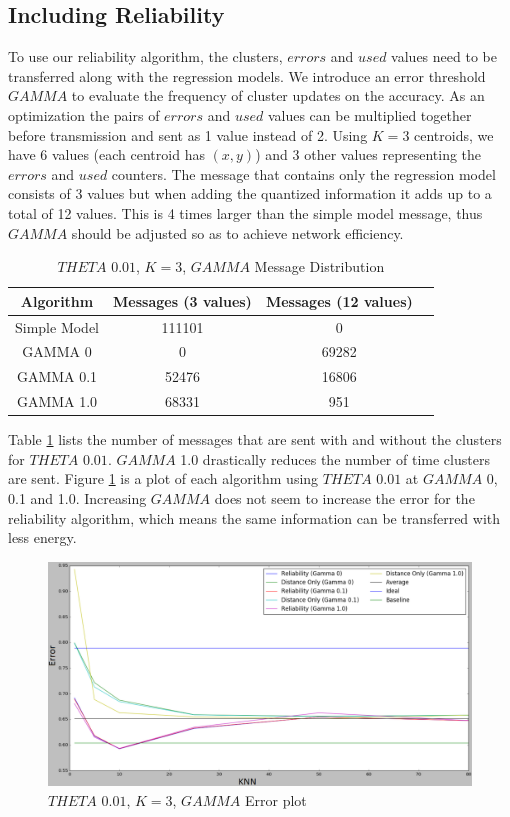 \documentclass{mproj}
\begin{document}
\subsection{Including Reliability}
To use our reliability algorithm, the clusters, $errors$ and $used$ values need to be transferred along with the regression models. We introduce an error threshold $GAMMA$ to evaluate the frequency of cluster updates on the accuracy. As an optimization the pairs of $errors$ and $used$ values can be multiplied together before transmission and sent as 1 value instead of 2. Using $K=3$ centroids, we have 6 values (each centroid has $(x,y)$) and 3 other values representing the $errors$ and $used$ counters. The message that contains only the regression model consists of 3 values but when adding the quantized information it adds up to a total of 12 values. This is 4 times larger than the simple model message, thus $GAMMA$ should be adjusted so as to achieve network efficiency.

\begin{table}[!ht]
 \centering
 \begin{tabular}{|| c | c | c | c ||}
 \hline
 Algorithm & Messages (3 values) & Messages (12 values)\\
 \hline\hline
 Simple Model & 111101 & 0 \\ 
 \hline
 GAMMA 0 & 0 & 69282 \\
 \hline
 GAMMA 0.1 & 52476 & 16806 \\
 \hline
 GAMMA 1.0 & 68331 & 951 \\
 \hline
\end{tabular}
\caption{$THETA$ $0.01$, $K=3$, $GAMMA$ Message Distribution}
 \label{table:thetaGammaMessages} 
\end{table}

Table \ref{table:thetaGammaMessages} lists the number of messages that are sent with and without the clusters for $THETA$ $0.01$. $GAMMA$ 1.0 drastically reduces the number of time clusters are sent. Figure \ref{fig:gammak3} is a plot of each algorithm using $THETA$ $0.01$ at $GAMMA$ 0, 0.1 and 1.0. Increasing $GAMMA$ does not seem to increase the error for the reliability algorithm, which means the same information can be transferred with less energy. 

\begin{figure}[H]
\caption{$THETA$ $0.01$, $K=3$, $GAMMA$ Error plot}
\label{fig:gammak3}
\centerline{\includegraphics[scale=0.5]{k3gamma}}
\end{figure}
\end{document}
